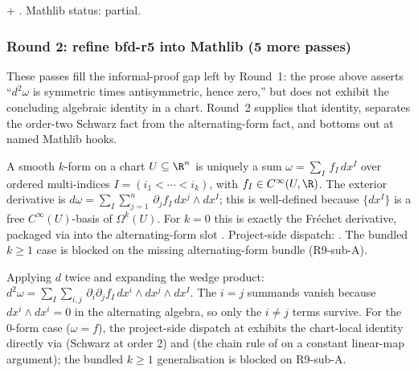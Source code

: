 \begin{lemma}
\label{lem:bfp-r10}
 + .  Mathlib status: partial.
\leanok
\end{lemma}

\subsubsection*{Round 2: refine bfd-r5 into Mathlib (5 more passes)}

These passes fill the informal-proof gap left by Round~1: the prose
above asserts ``$d^{2}\omega$ is symmetric times antisymmetric, hence
zero,'' but does not exhibit the concluding algebraic identity in a
chart.  Round~2 supplies that identity, separates the order-two
Schwarz fact from the alternating-form fact, and bottoms out at named
Mathlib hooks.

\begin{lemma}
\label{lem:bfd-r6}
A smooth $k$-form on a chart $U\subseteq\R^{n}$ is uniquely a sum
$\omega = \sum_{I}\,f_{I}\,dx^{I}$ over ordered multi-indices
$I = (i_{1}<\cdots<i_{k})$, with $f_{I}\in C^{\infty}(U,\R)$.  The
exterior derivative is
$d\omega = \sum_{I}\sum_{j=1}^{n}\,\partial_{j}f_{I}\,dx^{j}\wedge dx^{I}$;
this is well-defined because $\{dx^{I}\}$ is a free $C^{\infty}(U)$-basis
of $\Omega^{k}(U)$.  For $k=0$ this is exactly the Fr\'echet
derivative, packaged via  into
the alternating-form slot .  Project-side dispatch:
.
The bundled $k\geq 1$ case is blocked on the missing alternating-form
bundle (R9-sub-A).
\leanok
\end{lemma}

\begin{lemma}
\label{lem:bfd-r7}
Applying $d$ twice and expanding the wedge product:
\(
d^{2}\omega
  = \sum_{I}\sum_{i,j}\,\partial_{i}\partial_{j}f_{I}\,
        dx^{i}\wedge dx^{j}\wedge dx^{I}.
\)
The $i=j$ summands vanish because $dx^{i}\wedge dx^{i}=0$ in the
alternating algebra, so only the $i\neq j$ terms survive.  For the
0-form case ($\omega = f$), the project-side dispatch at
exhibits the chart-local identity directly via
 (Schwarz at order 2) and
 (the chain rule of  on a
constant linear-map argument); the bundled $k\geq 1$ generalisation
is blocked on R9-sub-A.
\leanok
\end{lemma}

